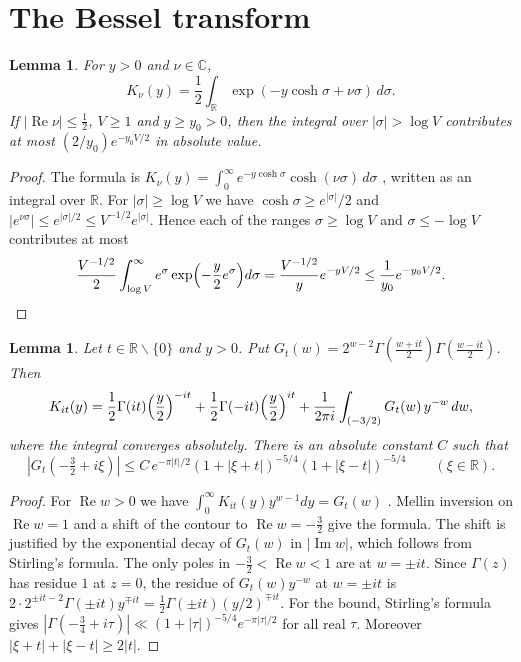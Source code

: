 \documentclass[11pt]{amsart}
\newtheorem{lemma}[theorem]{Lemma}
\theoremstyle{remark}
\theoremstyle{definition}
\numberwithin{equation}{section}
\newcommand{\R}{\mathbb{R}}
\newcommand{\C}{\mathbb{C}}
\begin{document}
\section{The Bessel transform}\label{sec:bessel}

\begin{lemma}\label{lem:vrep}
For $y>0$ and $\nu\in\C$,
\[
K_\nu(y)=\frac12\int_\R\exp(-y\cosh\sigma+\nu\sigma)\,d\sigma .
\]
If $|\operatorname{Re}\nu|\le\frac12$, $V\ge1$ and $y\ge y_0>0$, then the integral over $|\sigma|>\log V$ contributes at most $(2/y_0)e^{-y_0V/2}$ in absolute value.
\end{lemma}

\begin{proof}
The formula is $K_\nu(y)=\int_0^\infty e^{-y\cosh\sigma}\cosh(\nu\sigma)\,d\sigma$ \cite[\S6.22]{Wat}, written as an integral over $\R$. For $|\sigma|\ge\log V$ we have $\cosh\sigma\ge e^{|\sigma|}/2$ and $|e^{\nu\sigma}|\le e^{|\sigma|/2}\le V^{-1/2}e^{|\sigma|}$. Hence each of the ranges $\sigma\ge\log V$ and $\sigma\le-\log V$ contributes at most
\[
\frac{V^{-1/2}}2\int_{\log V}^\infty e^{\sigma}\exp\Bigl(-\frac y2e^{\sigma}\Bigr)d\sigma=\frac{V^{-1/2}}ye^{-yV/2}\le\frac1{y_0}e^{-y_0V/2}.\qedhere
\]
\end{proof}

\begin{lemma}\label{lem:MB}
Let $t\in\R\smallsetminus\{0\}$ and $y>0$. Put $G_t(w)=2^{w-2}\Gamma(\frac{w+it}2)\Gamma(\frac{w-it}2)$. Then
\[
K_{it}(y)=\frac12\Gamma(it)\Bigl(\frac y2\Bigr)^{-it}+\frac12\Gamma(-it)\Bigl(\frac y2\Bigr)^{it}+\frac1{2\pi i}\int_{(-3/2)}G_t(w)\,y^{-w}\,dw,
\]
where the integral converges absolutely. There is an absolute constant $C$ such that
\[
|G_t(-\tfrac32+i\xi)|\le C\,e^{-\pi|t|/2}(1+|\xi+t|)^{-5/4}(1+|\xi-t|)^{-5/4}\qquad(\xi\in\R).
\]
\end{lemma}

\begin{proof}
For $\operatorname{Re}w>0$ we have $\int_0^\infty K_{it}(y)y^{w-1}dy=G_t(w)$ \cite[6.561.16]{GR}. Mellin inversion on $\operatorname{Re}w=1$ and a shift of the contour to $\operatorname{Re}w=-\frac32$ give the formula. The shift is justified by the exponential decay of $G_t(w)$ in $|\operatorname{Im}w|$, which follows from Stirling's formula. The only poles in $-\frac32<\operatorname{Re}w<1$ are at $w=\pm it$. Since $\Gamma(z)$ has residue $1$ at $z=0$, the residue of $G_t(w)y^{-w}$ at $w=\pm it$ is $2\cdot2^{\pm it-2}\Gamma(\pm it)y^{\mp it}=\frac12\Gamma(\pm it)(y/2)^{\mp it}$. For the bound, Stirling's formula gives $|\Gamma(-\frac34+i\tau)|\ll(1+|\tau|)^{-5/4}e^{-\pi|\tau|/2}$ for all real $\tau$. Moreover $|\xi+t|+|\xi-t|\ge2|t|$.
\end{proof}
\end{document}
